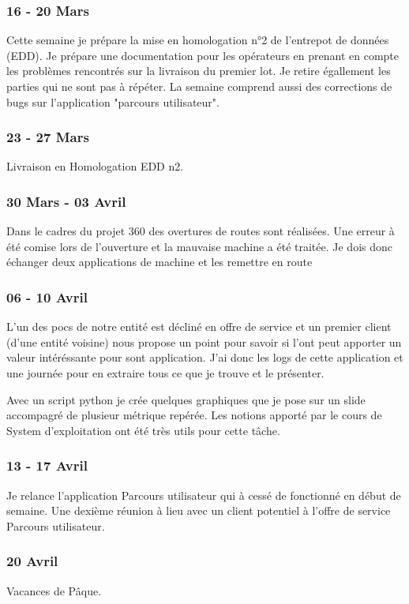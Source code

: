 \subsubsection*{16 - 20 Mars}
Cette semaine je prépare la mise en homologation n°2 de l'entrepot de données (EDD). Je prépare une documentation pour les opérateurs en prenant en compte les problèmes rencontrés sur la livraison du premier lot. Je retire égallement les parties qui ne sont pas à répéter. La semaine comprend aussi des corrections de bugs sur l'application "parcours utilisateur".

\subsubsection*{23 - 27 Mars}
Livraison en Homologation EDD n2.

\subsubsection*{30 Mars - 03 Avril}
Dans le cadres du projet 360 des overtures de routes sont réalisées. Une erreur à été comise lors de l'ouverture et la mauvaise machine a été traitée. Je dois donc échanger deux applications de machine et les remettre en route

\subsubsection*{06 - 10 Avril}
L'un des pocs de notre entité est décliné en offre de service et un premier client (d'une entité voisine) nous propose un point pour savoir si l'ont peut apporter un valeur intéréssante pour sont application.
J'ai donc les logs de cette application et une journée pour en extraire tous ce que je trouve et le présenter. 

Avec un script python je crée quelques graphiques que je pose sur un slide accompagré de plusieur métrique repérée. Les notions apporté par le cours de System d'exploitation ont été très utils pour cette tâche.

\subsubsection*{13 - 17 Avril}
Je relance l'application Parcours utilisateur qui à cessé de fonctionné en début de semaine. Une dexième réunion à lieu avec un client potentiel à l'offre de service Parcours utilisateur.

\subsubsection*{20 Avril}
Vacances de Pâque.


